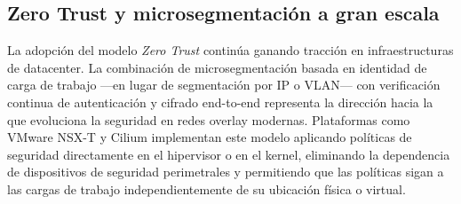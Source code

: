 \subsection{Zero Trust y microsegmentación a gran escala}

La adopción del modelo \textit{Zero Trust} continúa ganando tracción en infraestructuras de datacenter. La combinación de microsegmentación basada en identidad de carga de trabajo —en lugar de segmentación por IP o VLAN— con verificación continua de autenticación y cifrado end-to-end representa la dirección hacia la que evoluciona la seguridad en redes overlay modernas. Plataformas como VMware NSX-T y Cilium implementan este modelo aplicando políticas de seguridad directamente en el hipervisor o en el kernel, eliminando la dependencia de dispositivos de seguridad perimetrales y permitiendo que las políticas sigan a las cargas de trabajo independientemente de su ubicación física o virtual.
